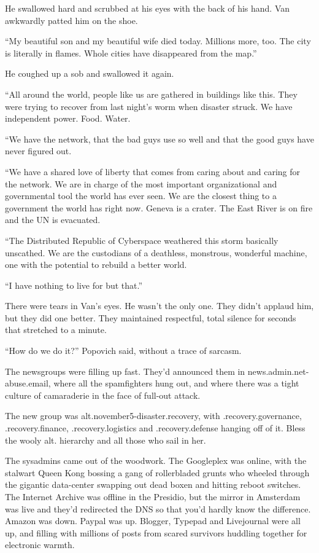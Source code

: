 He swallowed hard and scrubbed at his eyes with the back of his
hand. Van awkwardly patted him on the shoe.

“My beautiful son and my beautiful wife died today. Millions more,
too. The city is literally in flames. Whole cities have disappeared
from the map.”

He coughed up a sob and swallowed it again.

“All around the world, people like us are gathered in buildings
like this. They were trying to recover from last night’s worm when
disaster struck. We have independent power. Food. Water.

“We have the network, that the bad guys use so well and that the
good guys have never figured out.

“We have a shared love of liberty that comes from caring about and
caring for the network. We are in charge of the most important
organizational and governmental tool the world has ever seen. We
are the closest thing to a government the world has right now.
Geneva is a crater. The East River is on fire and the UN is
evacuated.

“The Distributed Republic of Cyberspace weathered this storm
basically unscathed. We are the custodians of a deathless,
monstrous, wonderful machine, one with the potential to rebuild a
better world.

“I have nothing to live for but that.”

There were tears in Van’s eyes. He wasn’t the only one. They didn’t
applaud him, but they did one better. They maintained respectful,
total silence for seconds that stretched to a minute.

“How do we do it?” Popovich said, without a trace of sarcasm.

\tb

The newsgroups were filling up fast. They’d announced them in
news.admin.net-abuse.email, where all the spamfighters hung out,
and where there was a tight culture of camaraderie in the face of
full-out attack.

The new group was alt.november5-disaster.recovery, with
.recovery.governance, .recovery.finance, .recovery.logistics and
.recovery.defense hanging off of it. Bless the wooly alt. hierarchy
and all those who sail in her.

The sysadmins came out of the woodwork. The Googleplex was online,
with the stalwart Queen Kong bossing a gang of rollerbladed grunts
who wheeled through the gigantic data-center swapping out dead
boxen and hitting reboot switches. The Internet Archive was offline
in the Presidio, but the mirror in Amsterdam was live and they’d
redirected the DNS so that you’d hardly know the difference. Amazon
was down. Paypal was up. Blogger, Typepad and Livejournal were all
up, and filling with millions of posts from scared survivors
huddling together for electronic warmth.

